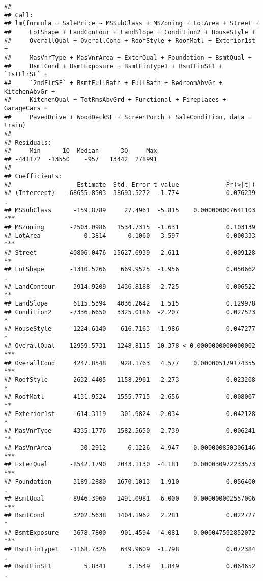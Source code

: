 \documentclass[]{article}
\begin{document}
\begin{verbatim}
## 
## Call:
## lm(formula = SalePrice ~ MSSubClass + MSZoning + LotArea + Street + 
##     LotShape + LandContour + LandSlope + Condition2 + HouseStyle + 
##     OverallQual + OverallCond + RoofStyle + RoofMatl + Exterior1st + 
##     MasVnrType + MasVnrArea + ExterQual + Foundation + BsmtQual + 
##     BsmtCond + BsmtExposure + BsmtFinType1 + BsmtFinSF1 + `1stFlrSF` + 
##     `2ndFlrSF` + BsmtFullBath + FullBath + BedroomAbvGr + KitchenAbvGr + 
##     KitchenQual + TotRmsAbvGrd + Functional + Fireplaces + GarageCars + 
##     PavedDrive + WoodDeckSF + ScreenPorch + SaleCondition, data = train)
## 
## Residuals:
##     Min      1Q  Median      3Q     Max 
## -441172  -13550    -957   13442  278991 
## 
## Coefficients:
##                  Estimate  Std. Error t value             Pr(>|t|)    
## (Intercept)   -68655.8503  38693.5272  -1.774             0.076239 .  
## MSSubClass      -159.8789     27.4961  -5.815    0.000000007641103 ***
## MSZoning       -2503.0986   1534.7315  -1.631             0.103139    
## LotArea            0.3814      0.1060   3.597             0.000333 ***
## Street         40806.0476  15627.6939   2.611             0.009128 ** 
## LotShape       -1310.5266    669.9525  -1.956             0.050662 .  
## LandContour     3914.9209   1436.8188   2.725             0.006522 ** 
## LandSlope       6115.5394   4036.2642   1.515             0.129978    
## Condition2     -7336.6650   3325.0186  -2.207             0.027523 *  
## HouseStyle     -1224.6140    616.7163  -1.986             0.047277 *  
## OverallQual    12959.5731   1248.8115  10.378 < 0.0000000000000002 ***
## OverallCond     4247.8548    928.1763   4.577    0.000005179174355 ***
## RoofStyle       2632.4405   1158.2961   2.273             0.023208 *  
## RoofMatl        4131.9524   1555.7715   2.656             0.008007 ** 
## Exterior1st     -614.3119    301.9824  -2.034             0.042128 *  
## MasVnrType      4335.1776   1582.5650   2.739             0.006241 ** 
## MasVnrArea        30.2912      6.1226   4.947    0.000000850306146 ***
## ExterQual      -8542.1790   2043.1130  -4.181    0.000030972233573 ***
## Foundation      3189.2880   1670.1013   1.910             0.056400 .  
## BsmtQual       -8946.3960   1491.0981  -6.000    0.000000002557006 ***
## BsmtCond        3202.5638   1404.1962   2.281             0.022727 *  
## BsmtExposure   -3678.7800    901.4594  -4.081    0.000047592852072 ***
## BsmtFinType1   -1168.7326    649.9609  -1.798             0.072384 .  
## BsmtFinSF1         5.8341      3.1549   1.849             0.064652 .  

\end{verbatim}
\end{document}
